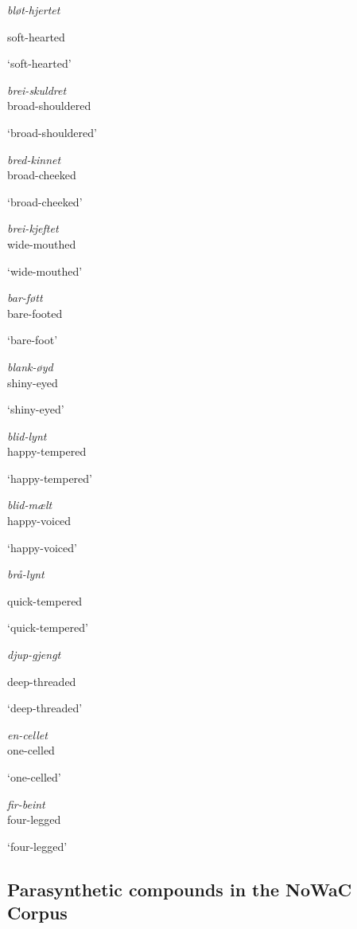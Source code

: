 \documentclass[output=paper]{LSP/langsci}
\begin{document}
\ea   \textit{bløt-hjertet} 

soft-hearted

‘soft-hearted’

\ex   \textit{brei-skuldret} \\
 

broad-shouldered

‘broad-shouldered’

\ex   \textit{bred-kinnet} \\
 

broad-cheeked

‘broad-cheeked’

\ex   \textit{brei-kjeftet} \\
 

wide-mouthed

‘wide-mouthed’

\ex  \textit{bar-føtt} \\
 

bare-footed

‘bare-foot’

\ex   \textit{blank-øyd} \\
 

shiny-eyed

‘shiny-eyed’

\ex   \textit{blid-lynt} \\
 

happy-tempered

‘happy-tempered’

\ex   \textit{blid-mælt} \\
 

happy-voiced

‘happy-voiced’

\ex   \textit{brå-lynt} 

quick-tempered

‘quick-tempered’

\ex  \textit{djup-gjengt} 

deep-threaded

 ‘deep-threaded’

\ex   \textit{en-cellet} \\
 

one-celled

 ‘one-celled’

\ex   \textit{fir-beint} \\
 

four-legged

‘four-legged’
\z
\z
\subsection{ Parasynthetic compounds in the NoWaC Corpus}
\end{document}
